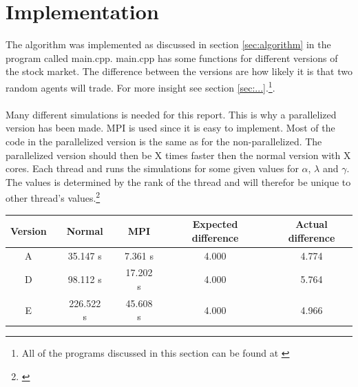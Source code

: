 \pagebreak
\section{Implementation}


The algorithm was implemented as discussed in section \ref{sec:algorithm} in the program called main.cpp. main.cpp has some functions for different versions of the stock market. The difference between the versions are how likely it is that two random agents will trade. For more insight see section \ref{sec:...}.\footnote{All of the programs discussed in this section can be found at \href{https://github.com/erikfsk/Project-5/tree/master/Project5}{\color{blue}{github}}}.
\\
\\
Many different simulations is needed for this report. This is why a parallelized version has been made. MPI is used since it is easy to implement. Most of the code in the parallelized version is the same as for the non-parallelized. The parallelized version should then be X times faster then the normal version with X cores. Each thread and runs the simulations for some given values for $\alpha$, $\lambda$ and $\gamma$. The values is determined by the rank of the thread and will therefor be unique to other thread's values.\footnote{\href{https://www.intel.com/content/www/us/en/architecture-and-technology/hyper-threading/hyper-threading-technology.html}{\color{blue}{Intel Hyper-Threading Technology}}}


\begin{center}
\label{tab:parallell}
\begin{tabularx}{\textwidth}{c X c X c X c X c}
    \hline 
    \hline 
       	Version && Normal && MPI && Expected difference && Actual difference\\ 
    \hline
        A   	&&      35.147  s	&&		7.361 s 	&&	4.000	&&	4.774	\\  
        D   	&&      98.112  s	&&		17.202 s	&&	4.000	&&	5.764	\\
        E   	&&      226.522 s	&&		45.608 s	&&	4.000	&&	4.966	\\
    \hline
\end{tabularx}
\end{center}


